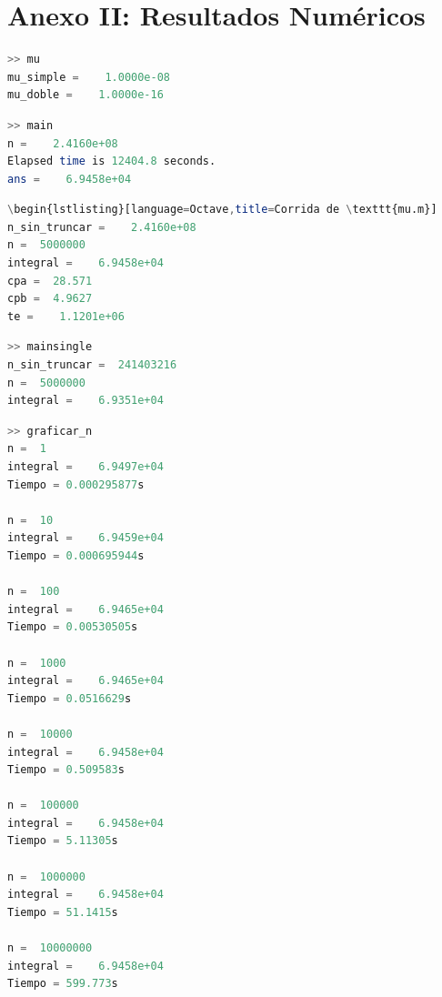 \documentclass[11pt,a4paper]{article}
\begin{document}
\newpage
\section{Anexo II: Resultados Numéricos}

\begin{lstlisting}[language=Octave,title=Corrida de \texttt{mu.m}]
>> mu
mu_simple =    1.0000e-08
mu_doble =    1.0000e-16
\end{lstlisting}

\begin{lstlisting}[language=Octave,title=title=Corrida de \texttt{main.m} con n original]
>> main
n =    2.4160e+08
Elapsed time is 12404.8 seconds.
ans =    6.9458e+04
\end{lstlisting}

\begin{lstlisting}[language=Octave,title=title=Corrida de \texttt{main.m}]
\begin{lstlisting}[language=Octave,title=Corrida de \texttt{mu.m}]
n_sin_truncar =    2.4160e+08
n =  5000000
integral =    6.9458e+04  
cpa =  28.571
cpb =  4.9627
te =    1.1201e+06
\end{lstlisting}

\begin{lstlisting}[language=Octave,title=title=Corrida de \texttt{mainsingle.m}]
>> mainsingle
n_sin_truncar =  241403216
n =  5000000
integral =    6.9351e+04
\end{lstlisting}

\begin{lstlisting}[language=Octave,title=Cálculos hechos para el criterio de truncamiento de n]
>> graficar_n
n =  1
integral =    6.9497e+04
Tiempo = 0.000295877s

n =  10
integral =    6.9459e+04
Tiempo = 0.000695944s

n =  100
integral =    6.9465e+04
Tiempo = 0.00530505s

n =  1000
integral =    6.9465e+04
Tiempo = 0.0516629s

n =  10000
integral =    6.9458e+04
Tiempo = 0.509583s

n =  100000
integral =    6.9458e+04
Tiempo = 5.11305s

n =  1000000
integral =    6.9458e+04
Tiempo = 51.1415s

n =  10000000
integral =    6.9458e+04
Tiempo = 599.773s
\end{lstlisting}
\end{document}

